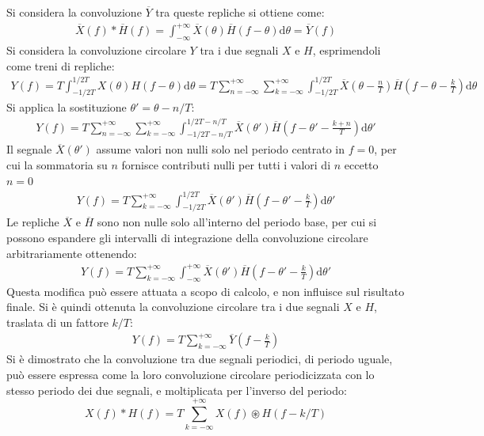 \documentclass{article}
\newcommand{\df}{\mathrm{d}}
\numberwithin{equation}{subsection}
\begin{document}
Si considera la convoluzione $\overline{Y}$ tra queste repliche si ottiene come:
\begin{gather*}
    \overline{X}(f)*\overline{H}(f)=\displaystyle\int_{-\infty}^{+\infty}\overline{X}(\theta)\overline{H}(f-\theta)\df\theta=\overline{Y}(f)
\end{gather*}
Si considera la convoluzione circolare $Y$ tra i due segnali $X$ e $H$, esprimendoli come treni di repliche:
\begin{gather*}
    Y(f)=\displaystyle T\int_{-1/2T}^{1/2T}X(\theta)H(f-\theta)\df\theta=T\sum_{n=-\infty}^{+\infty}\sum_{k=-\infty}^{+\infty}\int_{-1/2T}^{1/2T}\overline{X}\left(\theta-\frac{n}{T}\right)\overline{H}\left(f-\theta-\frac{k}{T}\right)\df\theta
\end{gather*}
Si applica la sostituzione $\theta'=\theta-n/T$:
\begin{gather*}
    Y(f)=T\displaystyle\sum_{n=-\infty}^{+\infty}\sum_{k=-\infty}^{+\infty}\int_{-1/2T-n/T}^{1/2T-n/T}\overline{X}(\theta')\overline{H}\left(f-\theta'-\frac{k+n}{T}\right)\df\theta'
\end{gather*}
Il segnale $\overline{X}(\theta')$ assume valori non nulli solo nel periodo centrato in $f=0$, per cui la sommatoria su $n$ fornisce contributi nulli 
per tutti i valori di $n$ eccetto $n=0$
\begin{gather*}
    Y(f)=T\displaystyle\sum_{k=-\infty}^{+\infty}\int_{-1/2T}^{1/2T}\overline{X}(\theta')\overline{H}\left(f-\theta'-\frac{k}{T}\right)\df\theta'
\end{gather*}
Le repliche $\overline{X}$ e $\overline{H}$ sono non nulle solo 
all'interno del periodo base, per cui si possono espandere gli intervalli di integrazione della convoluzione circolare arbitrariamente ottenendo:
\begin{gather*}
    Y(f)=T\displaystyle\sum_{k=-\infty}^{+\infty}\int_{-\infty}^{+\infty}\overline{X}(\theta')\overline{H}\left(f-\theta'-\frac{k}{T}\right)\df\theta'
\end{gather*}
Questa modifica può essere attuata a scopo di calcolo, e non influisce sul risultato finale. Si è quindi ottenuta la convoluzione circolare tra i due segnali $X$ e 
$H$, traslata di un fattore $k/T$:
\begin{gather*}
    Y(f)=T\displaystyle\sum_{k=-\infty}^{+\infty}\overline{Y}\left(f-\frac{k}{T}\right)
\end{gather*}
Si è dimostrato che la convoluzione tra due segnali periodici, di periodo uguale, può essere espressa come la loro convoluzione circolare periodicizzata con lo stesso 
periodo dei due segnali, e moltiplicata per l'inverso del periodo:
\begin{equation}
    X(f)*H(f)=\displaystyle T\sum_{k=-\infty}^{+\infty} X(f) 
    \circledast 
    H(f-k/T)
\end{equation}
\end{document}
